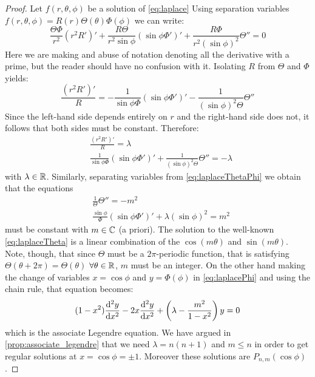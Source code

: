 \documentclass[../main.tex]{subfiles}
\begin{document}
\begin{proof}
  Let $f(r,\theta,\phi)$ be a solution of \cref{eq:laplace} Using separation variables $f(r,\theta,\phi)=R(r)\Theta(\theta)\Phi(\phi)$ we can write:
  \begin{equation}
    \frac{\Theta\Phi}{r^2}{(r^2R')}'+\frac{R\Theta}{r^2\sin\phi}{(\sin\phi\Phi')}'+\frac{R\Phi}{r^2{(\sin\phi)}^2}\Theta''=0
  \end{equation}
  Here we are making and abuse of notation denoting all the derivative with a prime, but the reader should have no confusion with it. Isolating $R$ from $\Theta$ and $\Phi$ yields:
  \begin{equation}
    \frac{{(r^2R')}'}{R}=-\frac{1}{\sin\phi\Phi}{(\sin\phi\Phi')}'-\frac{1}{{(\sin\phi)}^2\Theta}\Theta''
  \end{equation}
  Since the left-hand side depends entirely on $r$ and the right-hand side does not, it follows that both sides must be constant. Therefore:
  \begin{align}
    \label{eq:laplaceR}        & \frac{{(r^2R')}'}{R}=\lambda                                                               \\
    \label{eq:laplaceThetaPhi} & \frac{1}{\sin\phi\Phi}{(\sin\phi\Phi')}'+\frac{1}{{(\sin\phi)}^2\Theta}\Theta''  =-\lambda
  \end{align}
  with $\lambda\in\mathbb{R}$. Similarly, separating variables from \cref{eq:laplaceThetaPhi} we obtain that the equations
  \begin{align}
    \label{eq:laplaceTheta} & \frac{1}{\Theta}\Theta''  =-m^2                                     \\
    \label{eq:laplacePhi}   & \frac{\sin\phi}{\Phi}{(\sin\phi\Phi')}'+\lambda{(\sin\phi)}^2  =m^2
  \end{align}
  must be constant with $m\in\mathbb{C}$ (a priori). The solution to the well-known \cref{eq:laplaceTheta} is a linear combination of the $\cos(m\theta)$ and $\sin(m\theta)$. Note, though, that since $\Theta$ must be a $2\pi$-periodic function, that is satisfying $\Theta(\theta+2\pi)=\Theta(\theta)$ $\forall\theta\in\mathbb{R}$, $m$ must be an integer. On the other hand making the change of variables $x=\cos \phi$ and $y=\Phi(\phi)$ in \cref{eq:laplacePhi} and using the chain rule, that equation becomes:
  \begin{equation}\label{}
    (1-x^2)\dv[2]{y}{x}-2x\dv[2]{y}{x}+\left(\lambda-\frac{m^2}{1-x^2}\right)y=0
  \end{equation}
  which is the associate Legendre equation. We have argued in \cref{prop:associate_legendre} that we need $\lambda=n(n+1)$ and $m\leq n$ in order to get regular solutions at $x=\cos\phi=\pm 1$. Moreover these solutions are $P_{n,m}(\cos\phi)$.


\end{proof}
\end{document}
